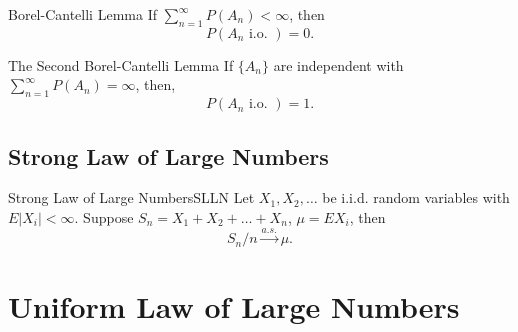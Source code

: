 \begin{theorem}{Borel-Cantelli Lemma}{}
    If $\sum_{n=1}^{\infty}P\left(A_{n}\right)<\infty$, then
    \begin{equation}
        P\left(A_{n}\text{ i.o. }\right)=0.
    \end{equation}
\end{theorem}

\begin{theorem}{The Second Borel-Cantelli Lemma}{}
    If $\{A_n\}$ are independent with $\sum_{n=1}^{\infty}P\left(A_{n}\right)=\infty$, then,
    \begin{equation}
        P\left(A_{n}\text{ i.o. }\right)=1.
    \end{equation}
\end{theorem}

\subsection{Strong Law of Large Numbers}

\begin{theorem}{Strong Law of Large Numbers}{SLLN}
    Let $X_1,X_2,\ldots$ be i.i.d. random variables with $E|X_i|<\infty$. Suppose $S_n=X_1+X_2+\ldots+X_n$, $\mu=EX_i$, then
    \begin{equation}
        S_n/n\stackrel{a.s.}{\rightarrow}\mu.
    \end{equation}
\end{theorem}

\section{Uniform Law of Large Numbers}